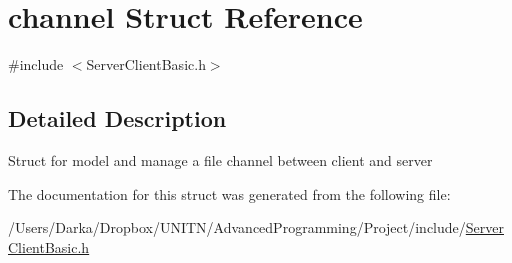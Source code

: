 \hypertarget{structchannel}{}\section{channel Struct Reference}
\label{structchannel}


{\ttfamily \#include $<$Server\+Client\+Basic.\+h$>$}



\subsection{Detailed Description}
Struct for model and manage a file channel between client and server 

The documentation for this struct was generated from the following file\+:\begin{DoxyCompactItemize}
\item 
/\+Users/\+Darka/\+Dropbox/\+U\+N\+I\+T\+N/\+Advanced\+Programming/\+Project/include/\hyperlink{_server_client_basic_8h}{Server\+Client\+Basic.\+h}\end{DoxyCompactItemize}
